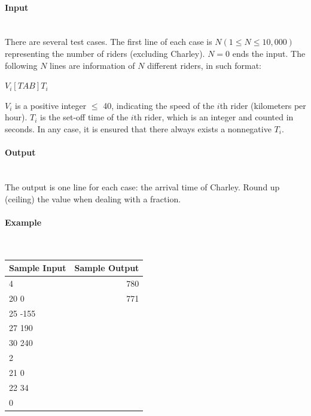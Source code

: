\documentclass{article}
\begin{document}
\paragraph{Input} \mbox{} \\

There are several test cases. The first line of each case is $N (1 \leq N \leq 10,000)$ representing the number of riders (excluding Charley). $N = 0$ ends the input. The following $N$ lines are information of $N$ different riders, in such format:

\begin{center}
    $V_i [TAB]T_i$
\end{center}

$V_i$ is a positive integer $\leq$ 40, indicating the speed of the $i$th rider (kilometers per hour). $T_i$ is the
set-off time of the $i$th rider, which is an integer and counted in seconds. In any case, it is ensured
that there always exists a nonnegative $T_i$.

\paragraph{Output}\mbox{} \\

The output is one line for each case: the arrival time of Charley. Round up (ceiling) the value when dealing with a fraction.

\paragraph{Example}\mbox{} \\

\begin{table}[h]
    \centering
    \begin{tabular}{|l|r|}
        \hline
        \textbf{Sample Input} & \textbf{Sample Output} \\
        \hline
        4    & 780   \\ 
        20 0    & 771 \\ 
        25 -155    &  \\ 
        27 190    &  \\ 
        30 240    &  \\ 
        2    &  \\
        21 0 & \\
        22 34 & \\
        0 & \\
        \hline
    \end{tabular}
\end{table}
\end{document}
